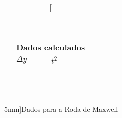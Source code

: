 \begin{table*}[!ht]
\begin{tabular}{lp{25mm}p{25mm}p{25mm}l}
        & \cellcolor[gray]{0.89} & \cellcolor[gray]{0.92} & \cellcolor[gray]{0.89} \\
        & \cellcolor[gray]{0.95} & \cellcolor[gray]{0.97} & \cellcolor[gray]{0.95} \\
        & \cellcolor[gray]{0.89} & \cellcolor[gray]{0.92} & \cellcolor[gray]{0.89} \\
        & \cellcolor[gray]{0.95} & \cellcolor[gray]{0.97} & \cellcolor[gray]{0.95} \\
        & \cellcolor[gray]{0.89} & \cellcolor[gray]{0.92} & \cellcolor[gray]{0.89} \\
        & \cellcolor[gray]{0.95} & \cellcolor[gray]{0.97} & \cellcolor[gray]{0.95} \\
        \cmidrule{2-4}
    \\
        & \multicolumn{3}{l}{\textbf{Dados calculados}} \\
        \cmidrule{2-3}
        & $\Delta y$ & $t^2$ \\
        \cmidrule{2-3}
        & \cellcolor[gray]{0.89} & \cellcolor[gray]{0.92} \\ 
        & \cellcolor[gray]{0.95} & \cellcolor[gray]{0.97} \\ 
        & \cellcolor[gray]{0.89} & \cellcolor[gray]{0.92} \\ 
        & \cellcolor[gray]{0.95} & \cellcolor[gray]{0.97} \\ 
        & \cellcolor[gray]{0.89} & \cellcolor[gray]{0.92} \\ 
        & \cellcolor[gray]{0.95} & \cellcolor[gray]{0.97} \\ 
        & \cellcolor[gray]{0.89} & \cellcolor[gray]{0.92} \\ 
        & \cellcolor[gray]{0.95} & \cellcolor[gray]{0.97} \\ 
        & \cellcolor[gray]{0.89} & \cellcolor[gray]{0.92} \\ 
        & \cellcolor[gray]{0.95} & \cellcolor[gray]{0.97} \\ 
        \cmidrule{2-3}
    \bottomrule
    \end{tabular}
    \caption[][5mm]{Dados para a Roda de Maxwell}
    \label{DadosRodaDeMaxwell}
    \end{table*}
